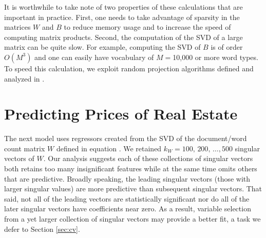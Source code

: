 \documentclass[10pt]{article}
\begin{document}
 It is worthwhile to take note of two properties of these calculations that are
 important in practice.  First, one needs to take advantage of sparsity in the
 matrices $W$ and $B$ to reduce memory usage and to increase the speed of
 computing matrix products.  Second, the computation of the SVD of a large
 matrix can be quite slow.  For example, computing the SVD of $B$ is of order
 $O(M^3)$ and one can easily have vocabulary of $M=$10,000 or more word types.
  To speed this calculation, we exploit random projection algorithms defined and
 analyzed in \citet{tropp10}.


\section{Predicting Prices of Real Estate}


 The next model uses regressors created from the SVD of the document/word
 count matrix $W$ defined in equation .  We retained $k_W = 100,\, 200, \, \ldots, 500$ singular vectors of $W$.   Our analysis suggests each of these collections of singular vectors both retains too many insignificant features while at the same time omits others that are predictive.  Broadly speaking, the leading singular vectors (those with larger singular values) are more predictive than subsequent singular vectors.  That said, not all of the leading vectors are statistically significant nor do all of the later singular vectors have coefficients near zero.   As a result, variable selection from a yet larger collection of singular vectors may provide a better fit, a task we defer to Section \ref{sec:cv}.  
 
\end{document}
